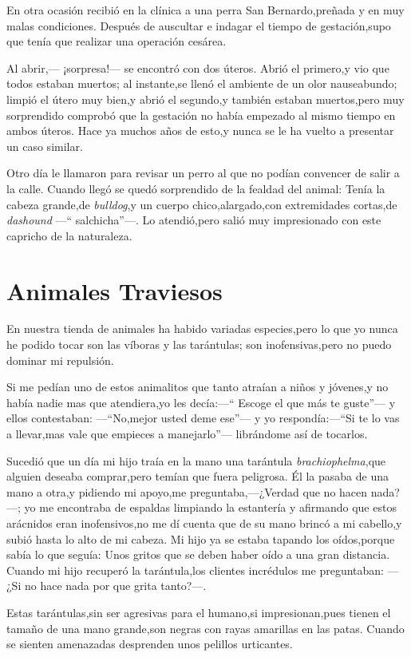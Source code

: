 \documentclass[letterpaper,12pt]{book}
\begin{document}
En otra ocasión recibió en la clínica a una perra San Bernardo,preñada y en muy malas condiciones. Después de auscultar e indagar el tiempo de gestación,supo que tenía que realizar una operación cesárea.

Al abrir,--- ¡sorpresa!--- se encontró con dos úteros. Abrió el primero,y vio que todos estaban muertos; al instante,se llenó el ambiente de un olor nauseabundo; limpió el útero muy bien,y abrió el segundo,y también estaban muertos,pero muy sorprendido comprobó que la gestación no había empezado al mismo tiempo en ambos úteros. Hace ya muchos años de esto,y nunca se le ha vuelto a presentar un caso similar.

Otro día le llamaron para revisar un perro al que no podían convencer de salir a la calle. Cuando llegó se quedó sorprendido de la fealdad del animal: Tenía la cabeza grande,de \textit{bulldog},y un cuerpo chico,alargado,con extremidades cortas,de \textit{dashound} ---`` salchicha''---. Lo atendió,pero salió muy impresionado con este capricho de la naturaleza.
\chapter{Animales Traviesos}
En nuestra tienda de animales ha habido variadas especies,pero lo que yo nunca he podido tocar son las víboras y las tarántulas; son inofensivas,pero no puedo dominar mi repulsión.

Si me pedían uno de estos animalitos que tanto atraían a niños y jóvenes,y no había nadie mas que atendiera,yo les decía:---`` Escoge el que más te guste''--- y ellos contestaban: ---``No,mejor usted deme ese''--- y yo respondía:---``Si te lo vas a llevar,mas vale que empieces a manejarlo''--- librándome así de tocarlos.

Sucedió que un día mi hijo traía en la mano una tarántula \textit{brachiophelma},que alguien deseaba comprar,pero temían que fuera peligrosa. Él la pasaba de una mano a otra,y pidiendo mi apoyo,me preguntaba,---¿Verdad que no hacen nada?---; yo me encontraba de espaldas limpiando la estantería y afirmando que estos arácnidos eran inofensivos,no me dí cuenta que de su mano brincó a mi cabello,y subió hasta lo alto de mi cabeza. Mi hijo ya se estaba tapando los oídos,porque sabía lo que seguía: Unos gritos que se deben haber oído a una gran distancia. Cuando mi hijo recuperó la tarántula,los clientes incrédulos me preguntaban: ---¿Si no hace nada por que grita tanto?---.

Estas tarántulas,sin ser agresivas para el humano,si impresionan,pues tienen el tamaño de una mano grande,son negras con rayas amarillas en las patas. Cuando se sienten amenazadas desprenden unos pelillos urticantes.
\end{document}
